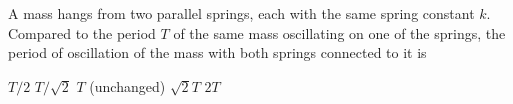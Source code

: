 \documentclass{../../../oss-apphys-exam}
\begin{document}
\begin{questions}
    
    
  \question A mass hangs from two parallel springs, each with the same spring
  constant $k$. Compared to the period $T$ of the same mass oscillating on
  one of the springs, the period of oscillation of the mass with both
  springs connected to it is
  \begin{choices}
    \choice $T/2$
    \choice $T/\sqrt2$
    \choice $T$ (unchanged)
    \choice $\sqrt2T$
    \choice $2T$
  \end{choices}
    

\end{questions}
\end{document}
